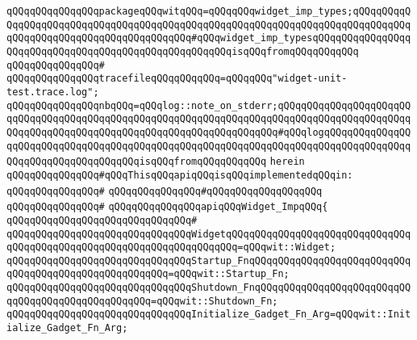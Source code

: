 \verb|qQQqqQQqqQQqqQQqpackageqQQqwitqQQq=qQQqqQQqwidget_imp_types;qQQqqQQqqQQqqQQqqQQqqQQqqQQqqQQqqQQqqQQqqQQqqQQqqQQqqQQqqQQqqQQqqQQqqQQqqQQqqQQqqQQqqQQqqQQqqQQqqQQqqQQqqQQqqQQq#qQQqwidget_imp_typesqQQqqQQqqQQqqQQqqQQqqQQqqQQqqQQqqQQqqQQqqQQqqQQqqQQqqQQqisqQQqfromqQQqqQQqqQQq|\newline
\verb|qQQqqQQqqQQqqQQq#|\newline
\verb|qQQqqQQqqQQqqQQqtracefileqQQqqQQqqQQq=qQQqqQQq"widget-unit-test.trace.log";|\newline
\newline
\verb|qQQqqQQqqQQqqQQqnbqQQq=qQQqlog::note_on_stderr;qQQqqQQqqQQqqQQqqQQqqQQqqQQqqQQqqQQqqQQqqQQqqQQqqQQqqQQqqQQqqQQqqQQqqQQqqQQqqQQqqQQqqQQqqQQqqQQqqQQqqQQqqQQqqQQqqQQqqQQqqQQqqQQqqQQqqQQqqQQq#qQQqlogqQQqqQQqqQQqqQQqqQQqqQQqqQQqqQQqqQQqqQQqqQQqqQQqqQQqqQQqqQQqqQQqqQQqqQQqqQQqqQQqqQQqqQQqqQQqqQQqqQQqqQQqqQQqisqQQqfromqQQqqQQqqQQq|\newline
\verb|herein|\newline
\newline
\verb|qQQqqQQqqQQqqQQq#qQQqThisqQQqapiqQQqisqQQqimplementedqQQqin:|\newline
\verb|qQQqqQQqqQQqqQQq#|\newline
\verb|qQQqqQQqqQQqqQQq#qQQqqQQqqQQqqQQqqQQq|\newline
\verb|qQQqqQQqqQQqqQQq#|\newline
\verb|qQQqqQQqqQQqqQQqapiqQQqWidget_ImpqQQq{|\newline
\verb|qQQqqQQqqQQqqQQqqQQqqQQqqQQqqQQq#|\newline
\verb|qQQqqQQqqQQqqQQqqQQqqQQqqQQqqQQqWidgetqQQqqQQqqQQqqQQqqQQqqQQqqQQqqQQqqQQqqQQqqQQqqQQqqQQqqQQqqQQqqQQqqQQqqQQq=qQQqwit::Widget;|\newline
\verb|qQQqqQQqqQQqqQQqqQQqqQQqqQQqqQQqStartup_FnqQQqqQQqqQQqqQQqqQQqqQQqqQQqqQQqqQQqqQQqqQQqqQQqqQQqqQQq=qQQqwit::Startup_Fn;|\newline
\verb|qQQqqQQqqQQqqQQqqQQqqQQqqQQqqQQqShutdown_FnqQQqqQQqqQQqqQQqqQQqqQQqqQQqqQQqqQQqqQQqqQQqqQQqqQQq=qQQqwit::Shutdown_Fn;|\newline
\newline
\verb|qQQqqQQqqQQqqQQqqQQqqQQqqQQqqQQqInitialize_Gadget_Fn_Arg=qQQqwit::Initialize_Gadget_Fn_Arg;|\newline
